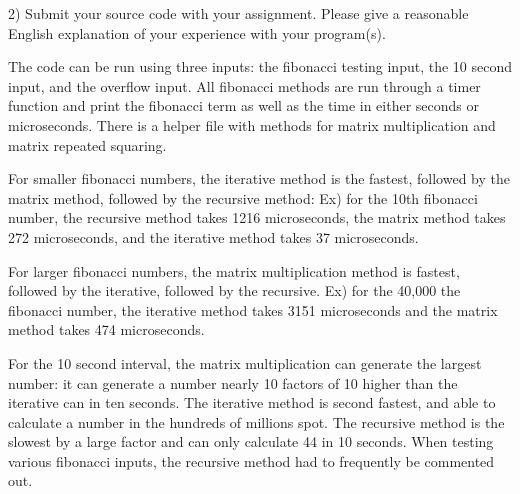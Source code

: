 \documentclass[11pt, solution, letterpaper]{format}
\begin{document}
2) Submit your source code with your assignment.  Please give
a reasonable English explanation of your experience with your program(s).

The code can be run using three inputs: the fibonacci testing input, the 10 second input, and the overflow input. All fibonacci methods are run through a timer function and print the fibonacci term as well as the time in either seconds or microseconds. There is a helper file with methods for matrix multiplication and matrix repeated squaring.

For smaller fibonacci numbers, the iterative method is the fastest, followed by the matrix method, followed by the recursive method: 
Ex) for the 10th fibonacci number, the recursive method takes 1216 microseconds, the matrix method takes 272 microseconds, and the iterative method takes 37 microseconds.

For larger fibonacci numbers, the matrix multiplication method is fastest, followed by the iterative, followed by the recursive. Ex) for the 40,000 the fibonacci number, the iterative method takes 3151 microseconds and the matrix method takes 474 microseconds.


For the 10 second interval, the matrix multiplication can generate the largest number: it can generate a number nearly 10 factors of 10 higher than the iterative can in ten seconds. The iterative method is second fastest, and able to calculate a number in the hundreds of millions spot. The recursive method is the slowest by a large factor and can only calculate 44 in 10 seconds. When testing various fibonacci inputs, the recursive method had to frequently be commented out.
\end{document}
